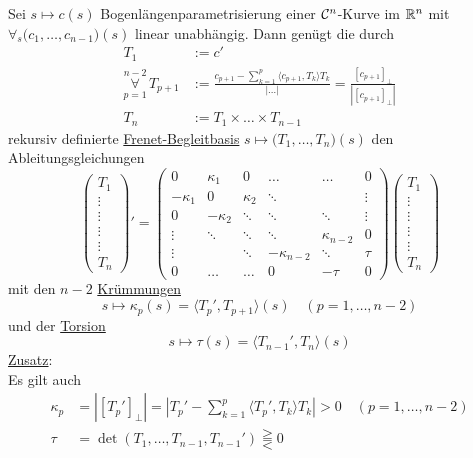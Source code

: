 \begin{satz}\label{satz141}
 Sei \(s \mapsto c(s)\) Bogenlängenparametrisierung einer \(\mathcal{C}^n\)-Kurve im \(\mathbb{R}^n\) mit \(\forall_s \big(c_1, \dots, c_{n-1}\big)(s)\) linear unabhängig. Dann genügt die durch
 \begin{align*}
  T_1 &:= c' \\
  \overset{n-2}{\underset{p=1}\forall} \, T_{p+1} &:= \frac{c_{p+1} - \sum_{k=1}^p \langle c_{p+1}, T_k\rangle T_k}{| \dots |} = \frac{[c_{p+1}]_\perp}{\left|[c_{p+1}]_\perp\right|} \\
  T_n &:= T_1 \times \dots \times T_{n-1}
 \end{align*}
rekursiv definierte \uline{Frenet-Begleitbasis} \(s \mapsto \big(T_1, \dots, T_n\big)(s)\) den Ableitungsgleichungen
\[
 \begin{pmatrix}
  T_1 \\
  \vdots \\
  \vdots \\
		\vdots \\
		\vdots \\
  T_n
 \end{pmatrix}' =
 \begin{pmatrix}
 0          & \kappa_1  & 0        & \hdots        & \hdots       & 0 \\
 -\kappa_1  & 0         & \kappa_2 & \ddots        &              & \vdots \\
 0          & -\kappa_2 &   \ddots & \ddots        & \ddots       & \vdots \\
 \vdots     & \ddots    & \ddots   & \ddots        & \kappa_{n-2} & 0 \\ 
 \vdots     &           & \ddots   & -\kappa_{n-2} & \ddots       & \tau\\
 0          & \hdots    & \hdots   & 0             & -\tau        & 0 
\end{pmatrix} \begin{pmatrix}
		T_1 \\
		\vdots \\
		\vdots \\
		\vdots \\
		\vdots \\
		T_n
	      \end{pmatrix}
\]
mit den \(n-2\) \uline{Krümmungen}
\[
 s \mapsto \kappa_p (s) = \langle T_p', T_{p+1} \rangle (s) \quad (p = 1, \dots, n-2)
\]
und der \uline{Torsion}
\[
 s \mapsto \tau(s) = \langle T_{n-1}', T_n \rangle(s)
\]
\uline{Zusatz}: \\
Es gilt auch
\begin{align*}
 \kappa_p &= \left| [T_p']_\perp \right| = \left| T_p' - \sum_{k=1}^p \langle T_p', T_k\rangle T_k \right| > 0 \quad (p = 1, \dots, n-2) \\
 \tau &= \det(T_1, \dots, T_{n-1}, T_{n-1}') \gtreqqless 0
\end{align*}

\end{satz}

